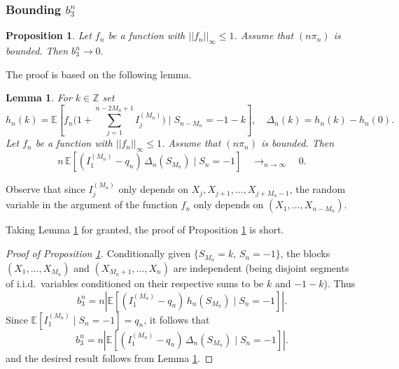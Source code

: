 \documentclass[a4paper,11pt]{article}
\newtheorem{lemma}[theorem]{Lemma}
\newtheorem{proposition}[theorem]{Proposition}
\newcommand{\E}{\mathbb{E}}
\DeclareRobustCommand{\1}{\mathbf{1}}
\newcommand{\Z}{\mathbb{Z}}
\begin{document}
\subsubsection{Bounding $b^{n}_3$}\label{sec:b3_common}

\begin{proposition}\label{prop:b3bis}
Let $f_{n}$ be a function with $||f_{n}||_{\infty} \leq 1$. Assume that $(n \pi_{n})$ is bounded. Then $b^{n}_{3} \rightarrow 0$.
\end{proposition}



  
  
The proof is based on the following  lemma.

\begin{lemma}\label{lem:1} For $k \in \Z$ set
$$  h_{n}(k)= \E\!\left[ f_{n}\big( 1 +\sum_{j=1}^{n-2M_{n}+1} I^{(M_{n})}_j\big) \;\Big|\; S_{n-M_{n}} = -1-k\right], \quad \Delta_{n}(k) = h_{n}(k) - h_{n}(0).$$
Let $f_{n}$ be a function with $||f_{n}||_{\infty} \leq 1$. Assume that $(n \pi_{n})$ is bounded. Then
$$n\,\E\!\left[(I_1^{(M_n)} - q_{n})\,\Delta_{n}(S_{M_n}) \mid S_n = -1\right]  \quad \mathop{\longrightarrow}_{n \rightarrow \infty} \quad0.$$
\end{lemma}
Observe that since $I^{(M_{n})}_j$ only depends on $X_{j},X_{j+1}, \ldots,X_{j+M_{n}-1}$, the random variable in the argument of the function $f_{n}$ only depends on $(X_{1}, \ldots,X_{n-M_{n}})$.

Taking Lemma \ref{lem:1} for granted, the proof of Proposition \ref{prop:b3bis} is short.
\begin{proof}[Proof of Proposition \ref{prop:b3bis}]
Conditionally given $\{S_{M_n} = k,\, S_n = -1\}$, the blocks $(X_1,\ldots,X_{M_n})$ and $(X_{M_n+1},\ldots,X_n)$ are independent (being disjoint segments of i.i.d.\ variables conditioned on their respective sums to be $k$ and $-1-k$).  Thus
$$b^{n}_{3} =  n \left| \E\!\left[(I_1^{(M_n)} - q_n)\,h_{n}(S_{M_n}) \mid S_n = -1\right]\right| .$$
Since $\E[I_1^{(M_n)} \mid S_{n}=-1]=q_{n}$, it follows that
$$b^{n}_{3} =  n \left| \E\!\left[(I_1^{(M_n)} - q_n)\,\Delta_{n}(S_{M_n}) \mid S_n = -1\right] \right|.$$
and the desired result follows from Lemma \ref{lem:1}.
\end{proof}
\end{document}

